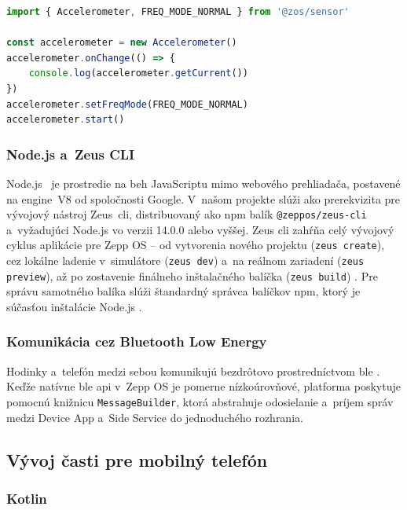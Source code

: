 \begin{lstlisting}[language=JavaScript, caption=Príklad inicializácie akcelerometra v~Zepp OS]
import { Accelerometer, FREQ_MODE_NORMAL } from '@zos/sensor'

const accelerometer = new Accelerometer()
accelerometer.onChange(() => {
    console.log(accelerometer.getCurrent())
})
accelerometer.setFreqMode(FREQ_MODE_NORMAL)
accelerometer.start()
\end{lstlisting}

\subsubsection{Node.js a~Zeus CLI}

Node.js~\cite{nodejs-definition} je prostredie na beh JavaScriptu mimo
webového prehliadača, postavené na engine~V8
od spoločnosti Google.
V~našom projekte slúži ako prerekvizita pre
vývojový nástroj Zeus~\Gls{cli}, distribuovaný
ako npm balík \texttt{@zeppos/zeus-cli} a~vyžadujúci
Node.js vo verzii 14.0.0 alebo vyššej. Zeus \Gls{cli}
zahŕňa celý vývojový cyklus aplikácie pre Zepp OS --
od vytvorenia nového projektu (\texttt{zeus create}),
cez lokálne ladenie v~simulátore (\texttt{zeus dev})
a~na reálnom zariadení (\texttt{zeus preview}), až
po zostavenie finálneho inštalačného balíčka
(\texttt{zeus build}) \cite{zepp_cli}. Pre správu
samotného balíka slúži štandardný správca balíčkov
\Gls{npm}, ktorý je súčasťou inštalácie Node.js
\cite{npm-definition}.

\subsubsection{Komunikácia cez Bluetooth Low Energy}

Hodinky a~telefón medzi sebou komunikujú bezdrôtovo
prostredníctvom \Gls{ble} \cite{zepp_bluetooth}.
Keďže natívne \Gls{ble} \Gls{api} v~Zepp OS je
pomerne nízkoúrovňové, platforma poskytuje pomocnú
knižnicu \texttt{MessageBuilder}, ktorá abstrahuje
odosielanie a~príjem správ medzi Device App a~Side
Service do jednoduchého rozhrania.

\subsection{Vývoj časti pre mobilný telefón}
\label{subsec:android-tech}

\subsubsection{Kotlin}

